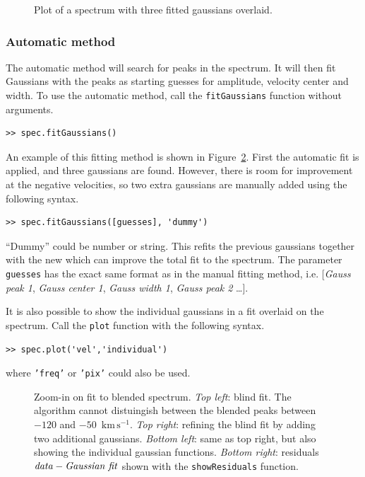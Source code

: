 \documentclass[11pt,a4paper]{article}
\newcommand\kms{$\mathrm{km} \, \mathrm{s}^{-1}$}
\begin{document}
\begin{figure}[h!]
  \centering
  \caption{Plot of a spectrum with three fitted gaussians overlaid.}
    \label{figGaussFit}
\end{figure}

\subsubsection{Automatic method}

The automatic method will search for peaks in the spectrum. It will
then fit Gaussians with the peaks as starting guesses for amplitude,
velocity center and width. To use the automatic method, call the
\texttt{fitGaussians} function without arguments.

\begin{lstlisting}
>> spec.fitGaussians()
\end{lstlisting}

An example of this fitting method is shown in Figure~\ref{fig6}. First
the automatic fit is applied, and three gaussians are found. However,
there is room for improvement at the negative velocities, so two extra
gaussians are manually added using the following syntax.

\begin{lstlisting}
>> spec.fitGaussians([guesses], 'dummy')
\end{lstlisting}

``Dummy'' could be number or string. This refits the previous
gaussians together with the new which can improve the total fit to the
spectrum. The parameter \texttt{guesses} has the exact same format as
in the manual fitting method, i.e. [\emph{Gauss peak 1}, \emph{Gauss
  center 1}, \emph{Gauss width 1}, \emph{Gauss peak 2} \ldots].

It is also possible to show the individual gaussians in a fit overlaid
on the spectrum. Call the \texttt{plot} function with the following
syntax.
\begin{lstlisting}
>> spec.plot('vel','individual')
\end{lstlisting}
where \texttt{'freq'} or \texttt{'pix'} could also be used. 

\begin{figure}[h!]
  \centering
  \caption{Zoom-in on fit to blended spectrum. \emph{Top left}: blind
    fit. The algorithm cannot distuingish between the blended peaks
    between $-120$ and $-50$~\kms. \emph{Top right}: refining the
    blind fit by adding two additional gaussians. \emph{Bottom left}:
    same as top right, but also showing the individual gaussian
    functions. \emph{Bottom right}: residuals $\mbox{\emph{data}} -
    \mbox{\emph{Gaussian fit}}$ shown with the \texttt{showResiduals}
    function.}
  \label{fig6}
\end{figure}
\end{document}
